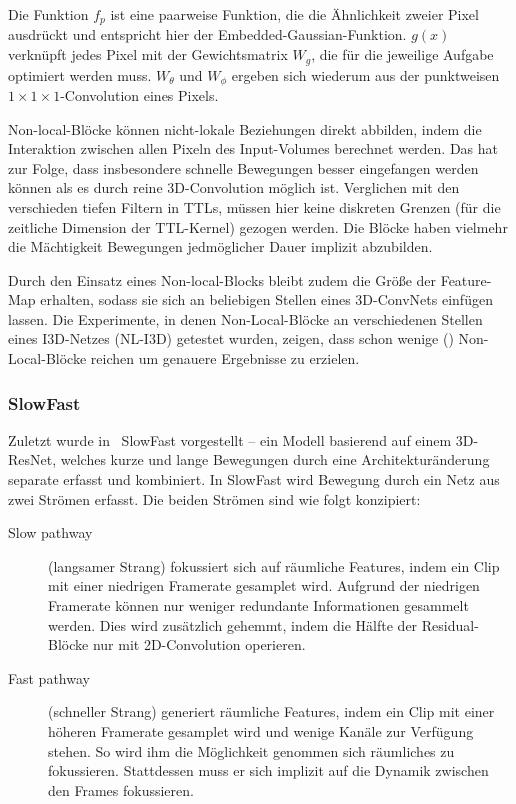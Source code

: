 Die Funktion $f_p$ ist eine paarweise Funktion, die die Ähnlichkeit zweier Pixel ausdrückt und entspricht hier der Embedded-Gaussian-Funktion.
$g(x)$ verknüpft jedes Pixel mit der Gewichtsmatrix $W_g$, die für die jeweilige Aufgabe optimiert werden muss.
$W_\theta$ und $W_\phi$ ergeben sich wiederum aus der punktweisen $1 \times 1 \times 1$-Convolution eines Pixels.

Non-local-Blöcke können nicht-lokale Beziehungen direkt abbilden, indem die Interaktion zwischen allen Pixeln des Input-Volumes berechnet werden.
Das hat zur Folge, dass insbesondere schnelle Bewegungen besser eingefangen werden können als es durch reine 3D-Convolution möglich ist.
Verglichen mit den verschieden tiefen Filtern in TTLs, müssen hier keine diskreten Grenzen (für die zeitliche Dimension der TTL-Kernel) gezogen werden.
Die Blöcke haben vielmehr die Mächtigkeit Bewegungen jedmöglicher Dauer implizit abzubilden.

Durch den Einsatz eines Non-local-Blocks bleibt zudem die Größe der Feature-Map erhalten, sodass sie sich an beliebigen Stellen eines 3D-ConvNets einfügen lassen.
Die Experimente, in denen Non-Local-Blöcke an verschiedenen Stellen eines I3D-Netzes (NL-I3D) getestet wurden, zeigen, dass schon wenige () Non-Local-Blöcke reichen um genauere Ergebnisse zu erzielen.

\subsubsection*{SlowFast}

Zuletzt wurde in~\cite{Feichtenhofer18} SlowFast vorgestellt -- ein Modell basierend auf einem 3D-ResNet, welches kurze und lange Bewegungen durch eine Architekturänderung separate erfasst und kombiniert.
In SlowFast wird Bewegung durch ein Netz aus zwei Strömen erfasst.
Die beiden Strömen sind wie folgt konzipiert:

\begin{description}
    \item[Slow pathway] (langsamer Strang) fokussiert sich auf räumliche Features, indem ein Clip mit einer niedrigen Framerate gesamplet wird.
    Aufgrund der niedrigen Framerate können nur weniger redundante Informationen gesammelt werden.
    Dies wird zusätzlich gehemmt, indem die Hälfte der Residual-Blöcke nur mit 2D-Convolution operieren.
    \item[Fast pathway] (schneller Strang) generiert räumliche Features, indem ein Clip mit einer höheren Framerate gesamplet wird und wenige Kanäle zur Verfügung stehen.
    So wird ihm die Möglichkeit genommen sich räumliches zu fokussieren.
    Stattdessen muss er sich implizit auf die Dynamik zwischen den Frames fokussieren.
\end{description}

